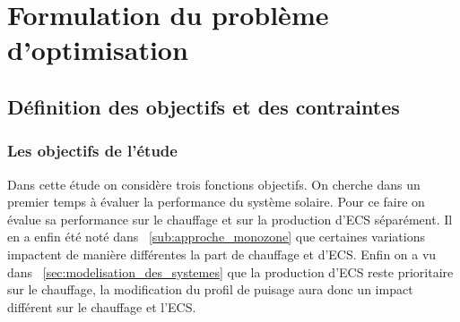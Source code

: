 

\section{Formulation du problème d’optimisation} %
\label{sec:formulation_du_probleme_d_optimisation}
\subsection{Définition des objectifs et des contraintes} %
\label{sub:definition_des_objectifs_et_des_contraintes}

\subsubsection{Les objectifs de l’étude} %
\label{ssub:les_objectifs_de_l_etude}
Dans cette étude on considère trois fonctions objectifs. On cherche dans un premier
temps à évaluer la performance du système solaire. Pour ce faire on évalue sa
performance sur le chauffage et sur la production d’ECS séparément. Il en a enfin
été noté dans ~\autoref{sub:approche_monozone} que certaines variations impactent
de manière différentes la part de chauffage et d’ECS. Enfin on a vu dans
~\autoref{sec:modelisation_des_systemes} que la production d’ECS reste prioritaire
sur le chauffage, la modification du profil de puisage aura donc un impact différent
sur le chauffage et l’ECS.

